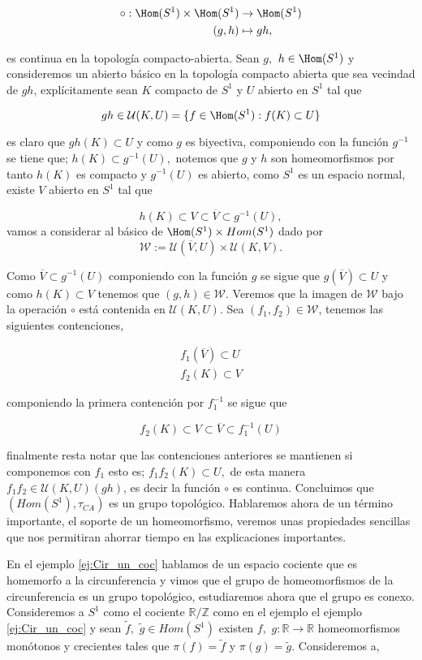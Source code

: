 \begin{align*}
\circ:\Hom(S^1) \times \Hom(S^1) & \to \Hom(S^1) \\
(g,h) & \mapsto gh,
\end{align*} 

es continua en la topología compacto-abierta. Sean $g,$ $h \in \Hom(S^1)$ y consideremos un abierto básico en la topología compacto abierta que sea vecindad de $gh$, explícitamente sean $K$ compacto de $S^1$ y $U$ abierto en $S^1$ tal que

$$gh \in\mathcal{U}(K,U)=\{f \in \Hom(S^1): f(K) \subset U\}$$

 es claro que $gh(K) \subset U$ y como $g$ es biyectiva,  componiendo con la función $g^{-1}$ se tiene que; $h(K) \subset g^{-1}(U),$ notemos que $g$ y $h$ son homeomorfismos por tanto $h(K)$ es compacto y $g^{-1}(U)$ es abierto, como $S^1$ es un espacio normal, existe $V$ abierto en $S^1$ tal que 

$$h(K) \subset V \subset \overline{V} \subset g^{-1}(U),$$
vamos a considerar al básico de   $\Hom(S^1) \times Hom(S^1)$ dado por  
$$\mathcal{W}:=\mathcal{U}(\overline{V},U) \times \mathcal{U}(K,V).$$

Como $\overline{V} \subset g^{-1}(U)$ componiendo con la función $g$ se sigue que $g(\overline{V}) \subset U$ y como $h(K) \subset V$ tenemos que $(g,h) \in \mathcal{W}$. Veremos que la imagen de $\mathcal{W}$ bajo la operación $\circ$ está contenida en $\mathcal{U}(K,U)$. Sea $(f_1,f_2) \in \mathcal{W}$, tenemos las siguientes contenciones,  

\begin{align*}
f_1(\overline{V})\subset U \\
f_2(K)\subset V 
\end{align*}

componiendo la primera contención por $f_1^{-1}$ se sigue que

$$f_2(K) \subset V \subset \overline{V} \subset f_1^{-1}(U)$$

finalmente resta notar que las contenciones anteriores se mantienen si componemos con $f_1$ esto es; $f_1f_2(K) \subset U,$ de esta manera $f_1f_2 \in \mathcal{U}(K,U)(gh)$, es decir la función $\circ$ es continua. Concluimos que $(Hom(S^1), \tau_{CA})$ es un grupo topológico. Hablaremos ahora de un término importante, el soporte de un homeomorfismo, veremos unas propiedades sencillas que nos permitiran ahorrar tiempo en las explicaciones importantes. 


 
  En el ejemplo \ref{ej:Cir_un_coc} hablamos de un espacio cociente que es homemorfo a la circunferencia y vimos que el grupo de homeomorfismos de la circunferencia es un grupo topológico, estudiaremos ahora que el grupo es conexo. Consideremos a $S^1$ como el cociente $\mathbb{R} / \mathbb{Z}$ como en el ejemplo el ejemplo \ref{ej:Cir_un_coc} y sean $\tilde{f},$ $\tilde{g} \in Hom(S^1)$ existen $f,$ $g: \mathbb{R} \to \mathbb{R}$ homeomorfismos monótonos y crecientes tales que $\pi(f)=\tilde{f}$ y $\pi(g)=\tilde{g}$. Consideremos a,

